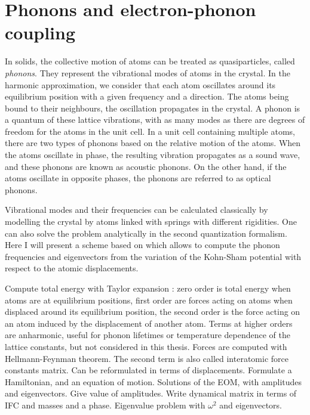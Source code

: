%
%
\section{Phonons and electron-phonon coupling}
In solids, the collective motion of atoms can be treated as quasiparticles, called \textit{phonons}. They represent the vibrational modes of atoms in the crystal. In the harmonic approximation, we consider that each atom oscillates around its equilibrium position with a given frequency and a direction. 
The atoms being bound to their neighbours, the oscillation propagates in the crystal. A phonon is a quantum of these lattice vibrations, with as many modes as there are degrees of freedom for the atoms in the unit cell. 
In a unit cell containing multiple atoms, there are two types of phonons based on the relative motion of the atoms. When the atoms oscillate in phase, the resulting vibration propagates as a sound wave, and these phonons are known as acoustic phonons. On the other hand, if the atoms oscillate in opposite phases, the phonons are referred to as optical phonons.

Vibrational modes and their frequencies can be calculated classically by modelling the crystal by atoms linked with springs with different rigidities. One can also solve the problem analytically in the second quantization formalism. Here I will present a scheme based on  which allows to compute the phonon frequencies and eigenvectors from the variation of the Kohn-Sham potential with respect to the atomic displacements. 

%
%
Compute total energy with Taylor expansion : zero order is total energy when atoms are at equilibrium positions, first order are forces acting on atoms when displaced around its equilibrium position, the second order is the force acting on an atom induced by the displacement of another atom. Terms at higher orders are anharmonic, useful for phonon lifetimes or temperature dependence of the lattice constants, but not considered in this thesis.
Forces are computed with Hellmann-Feynman theorem. The second term is also called interatomic force constants matrix. 
Can be reformulated in terms of displacements.
Formulate a Hamiltonian, and an equation of motion.
Solutions of the EOM, with amplitudes and eigenvectors. Give value of amplitudes.
Write dynamical matrix in terms of IFC and masses and a phase.
Eigenvalue problem with $\omega^2$ and eigenvectors.
%
%

